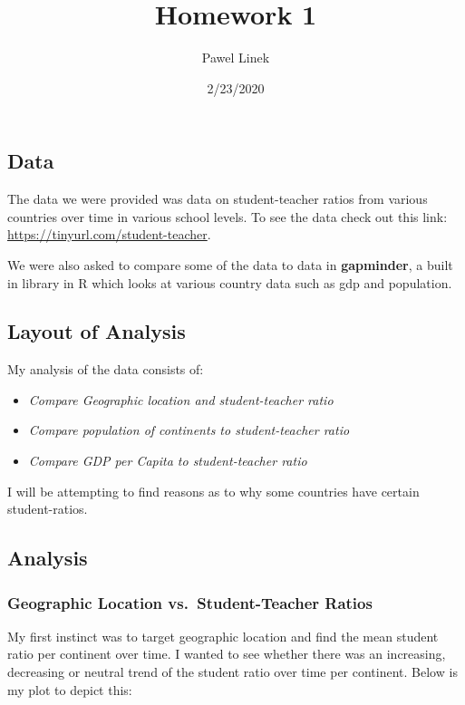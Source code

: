 \documentclass[
]{article}
\title{Homework 1}
\author{Pawel Linek}
\date{2/23/2020}
\providecommand{\tightlist}{%
  \setlength{\itemsep}{0pt}\setlength{\parskip}{0pt}}
\begin{document}
\maketitle

\hypertarget{data}{%
\subsection{Data}\label{data}}

The data we were provided was data on student-teacher ratios from
various countries over time in various school levels. To see the data
check out this link: \url{https://tinyurl.com/student-teacher}.

We were also asked to compare some of the data to data in
\textbf{gapminder}, a built in library in R which looks at various
country data such as gdp and population.

\hypertarget{layout-of-analysis}{%
\subsection{Layout of Analysis}\label{layout-of-analysis}}

My analysis of the data consists of:

\begin{itemize}
\tightlist
\item
  \emph{Compare Geographic location and student-teacher ratio}
\item
  \emph{Compare population of continents to student-teacher ratio}
\item
  \emph{Compare GDP per Capita to student-teacher ratio}
\end{itemize}

I will be attempting to find reasons as to why some countries have
certain student-ratios.

\hypertarget{analysis}{%
\subsection{Analysis}\label{analysis}}

\hypertarget{geographic-location-vs.-student-teacher-ratios}{%
\subsubsection{Geographic Location vs.~Student-Teacher
Ratios}\label{geographic-location-vs.-student-teacher-ratios}}

My first instinct was to target geographic location and find the mean
student ratio per continent over time. I wanted to see whether there was
an increasing, decreasing or neutral trend of the student ratio over
time per continent. Below is my plot to depict this:
\end{document}
